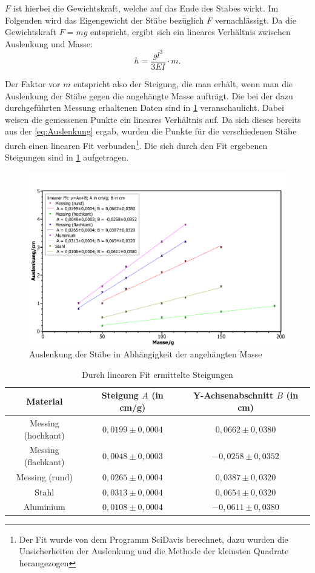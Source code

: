 \documentclass[11pt,a4paper,titlepage, ngerman]{article}
\begin{document}
		$F$ ist hierbei die Gewichtskraft, welche auf das Ende des Stabes wirkt. Im Folgenden wird das Eigengewicht der Stäbe bezüglich $F$ vernachlässigt.
		Da die Gewichtskraft $F = mg$ entspricht, ergibt sich ein lineares Verhältnis zwischen Auslenkung und Masse:
		\begin{equation}
			h = \frac{gl^3}{3EI}\cdot m. \label{eq:Auslenkung}
		\end{equation}
		 
		Der Faktor vor $m$ entspricht also der Steigung, die man erhält, wenn man die Auslenkung der Stäbe gegen die angehängte Masse aufträgt. Die bei der dazu durchgeführten Messung erhaltenen Daten sind in \cref{abb:linearerFit} veranschaulicht.		
		Dabei weisen die gemessenen Punkte ein lineares Verhältnis auf. Da sich dieses bereits aus der \cref{eq:Auslenkung} ergab, wurden die Punkte für die verschiedenen Stäbe durch einen linearen Fit verbunden\footnote{Der Fit wurde von dem Programm SciDavis berechnet, dazu wurden die Unsicherheiten der Auslenkung und die Methode der kleinsten Quadrate herangezogen}. Die sich durch den Fit ergebenen Steigungen sind in \cref{tab:Steigungen} aufgetragen.
		\begin{figure}[ht]
			\centering
			\includegraphics[width=\textwidth]{StabAuslenkungen.pdf}
			\caption{Auslenkung der Stäbe in Abhängigkeit der angehängten Masse}
			\label{abb:linearerFit}	
		\end{figure}
		\begin{table}[ht]
			\caption{Durch linearen Fit ermittelte Steigungen}
			\centering
			\label{tab:Steigungen}
			\begin{tabular}{c|c|c}
				{Material} & {Steigung $A$ (in cm/g)} & {Y-Achsenabschnitt $B$ (in cm)} \\
				\hline
				{Messing (hochkant)} & {$0,0199\pm 0,0004$} & {$0,0662\pm 0,0380$} \\
				{Messing (flachkant)} & {$0,0048\pm 0,0003$} & {$-0,0258\pm 0,0352$} \\
				{Messing (rund)} & {$0,0265\pm 0,0004$} & {$0,0387\pm 0,0320$} \\
				{Stahl} & {$0,0313\pm 0,0004$} & {$0,0654\pm 0,0320$} \\
				{Aluminium} & {$0,0108\pm 0,0004$} & {$-0,0611\pm 0,0380$} \\	
			\end{tabular}
		\end{table}
	
\end{document}
